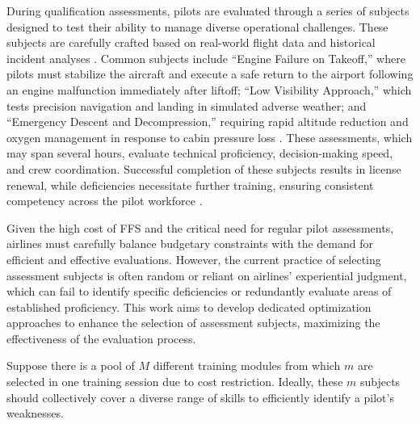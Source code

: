 \documentclass[opre,sglanonrev]{informs4}
\begin{document}
During qualification assessments, pilots are evaluated through a series of subjects designed to test their ability to manage diverse operational challenges. These subjects are carefully crafted based on real-world flight data and historical incident analyses%
\citep{NTSB2012}. Common subjects include ``Engine Failure on Takeoff,'' where pilots must stabilize the aircraft and execute a safe return to the airport following an engine malfunction immediately after liftoff; ``Low Visibility Approach,'' which tests precision navigation and landing in simulated adverse weather; and ``Emergency Descent and Decompression,'' requiring rapid altitude reduction and oxygen management in response to cabin pressure loss \citep{PilotWorkshops2023}. These assessments, which may span several hours, evaluate technical proficiency, decision-making speed, and crew coordination. Successful completion of these subjects results in license renewal, while deficiencies necessitate further training, ensuring consistent competency across the pilot workforce \citep{EASA2020}.

Given the high cost of FFS and the critical need for regular pilot assessments, airlines must carefully balance budgetary constraints with the demand for efficient and effective evaluations. However, the current practice of selecting assessment subjects is often random or reliant on airlines' experiential judgment, which can fail to identify specific deficiencies or redundantly evaluate areas of established proficiency. This work aims to develop dedicated optimization approaches to enhance the selection of assessment subjects, maximizing the effectiveness of the evaluation process.

Suppose there is a pool of $M$ different training modules from which $m$ are selected in one training session due to cost restriction. Ideally, these $m$ subjects should collectively cover a diverse range of skills to efficiently identify a pilot’s weaknesses. 
\end{document}

